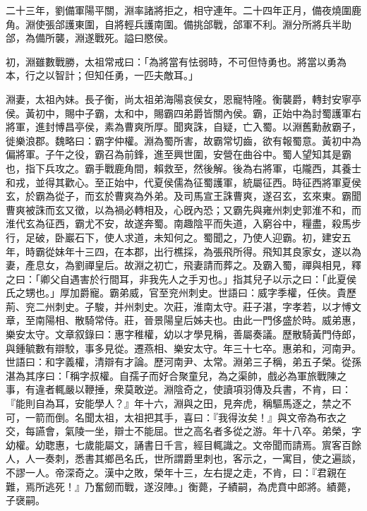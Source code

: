 \begin{pinyinscope}
二十三年，劉備軍陽平關，淵率諸將拒之，相守連年。二十四年正月，備夜燒圍鹿角。淵使張郃護東圍，自將輕兵護南圍。備挑郃戰，郃軍不利。淵分所將兵半助郃，為備所襲，淵遂戰死。謚曰愍侯。

初，淵雖數戰勝，太祖常戒曰：「為將當有怯弱時，不可但恃勇也。將當以勇為本，行之以智計；但知任勇，一匹夫敵耳。」

淵妻，太祖內妹。長子衡，尚太祖弟海陽哀侯女，恩寵特隆。衡襲爵，轉封安寧亭侯。黃初中，賜中子霸，太和中，賜霸四弟爵皆關內侯。霸，正始中為討蜀護軍右將軍，進封愽昌亭侯，素為曹爽所厚。聞爽誅，自疑，亡入蜀。以淵舊勳赦霸子，徙樂浪郡。魏略曰：霸字仲權。淵為蜀所害，故霸常切齒，欲有報蜀意。黃初中為偏將軍。子午之役，霸召為前鋒，進至興世圍，安營在曲谷中。蜀人望知其是霸也，指下兵攻之。霸手戰鹿角間，賴救至，然後解。後為右將軍，屯隴西，其養士和戎，並得其歡心。至正始中，代夏侯儒為征蜀護軍，統屬征西。時征西將軍夏侯玄，於霸為從子，而玄於曹爽為外弟。及司馬宣王誅曹爽，遂召玄，玄來東。霸聞曹爽被誅而玄又徵，以為禍必轉相及，心旣內恐；又霸先與雍州刺史郭淮不和，而淮代玄為征西，霸尤不安，故遂奔蜀。南趣陰平而失道，入窮谷中，糧盡，殺馬步行，足破，卧巖石下，使人求道，未知何之。蜀聞之，乃使人迎霸。初，建安五年，時霸從妹年十三四，在本郡，出行樵採，為張飛所得。飛知其良家女，遂以為妻，產息女，為劉禪皇后。故淵之初亡，飛妻請而葬之。及霸入蜀，禪與相見，釋之曰：「卿父自遇害於行間耳，非我先人之手刃也。」指其兒子以示之曰：「此夏侯氏之甥也。」厚加爵寵。霸弟威，官至兖州刺史。世語曰：威字季權，任俠。貴歷荊、兖二州刺史。子駿，并州刺史。次莊，淮南太守。莊子湛，字孝若，以才愽文章，至南陽相、散騎常侍。莊，晉景陽皇后姊夫也。由此一門侈盛於時。威弟惠，樂安太守。文章叙錄曰：惠字稚權，幼以才學見稱，善屬奏議。歷散騎黃門侍郎，與鍾毓數有辯駮，事多見從。遷燕相、樂安太守。年三十七卒。惠弟和，河南尹。世語曰：和字義權，清辯有才論。歷河南尹、太常。淵弟三子稱，弟五子榮。從孫湛為其序曰：「稱字叔權。自孺子而好合聚童兒，為之渠帥，戲必為軍旅戰陳之事，有違者輒嚴以鞭捶，衆莫敢逆。淵陰奇之，使讀項羽傳及兵書，不肯，曰：『能則自為耳，安能學人？』年十六，淵與之田，見奔虎，稱驅馬逐之，禁之不可，一箭而倒。名聞太祖，太祖把其手，喜曰：『我得汝矣！』與文帝為布衣之交，每讌會，氣陵一坐，辯士不能屈。世之高名者多從之游。年十八卒。弟榮，字幼權。幼聦惠，七歲能屬文，誦書日千言，經目輒識之。文帝聞而請焉。賔客百餘人，人一奏刺，悉書其鄉邑名氏，世所謂爵里刺也，客示之，一寓目，使之遍談，不謬一人。帝深奇之。漢中之敗，榮年十三，左右提之走，不肯，曰：『君親在難，焉所逃死！』乃奮劒而戰，遂沒陣。」衡薨，子績嗣，為虎賁中郎將。績薨，子襃嗣。


\end{pinyinscope}